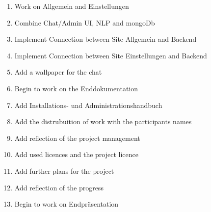 \begin{enumerate}
    \item Work on Allgemein and Einstellungen
    \item Combine Chat/Admin UI, NLP and mongoDb
    \item Implement Connection between Site Allgemein and Backend
    \item Implement Connection between Site Einstellungen and Backend
    \item Add a wallpaper for the chat
    \item Begin to work on the Enddokumentation
    \item Add Installations- und Administrationshandbuch
    \item Add the distrubuition of work with the participants names
    \item Add reflection of the project management
    \item Add used licences and the project licence
    \item Add further plans for the project
    \item Add reflection of the progress
    \item Begin to work on Endpräsentation
\end{enumerate}